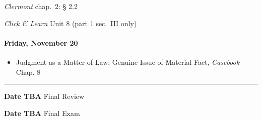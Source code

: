 \documentclass[11pt,letterpaper,twoside]{article}
\providecommand{\tightlist}{%
\setlength{\itemsep}{0em}\setlength{\parskip}{0em}\setlength{\itemindent}{0em}}
\begin{document}
\emph{Clermont} chap.~2: § 2.2

\emph{Click \& Learn} Unit 8 (part 1 sec.~III only)

\paragraph{Friday, November 20}\label{friday-november-20}

\begin{itemize}
\tightlist
\item
  Judgment as a Matter of Law; Genuine Issue of Material Fact,
  \emph{Casebook} Chap. 8
\end{itemize}

\begin{center}\rule{0.5\linewidth}{0.5pt}\end{center}

\textbf{Date TBA} Final Review

\textbf{Date TBA} Final Exam
\end{document}
